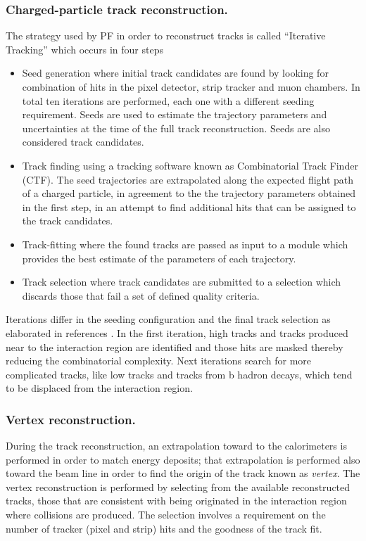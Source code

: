 \subsubsection*{Charged-particle track reconstruction.}

\noindent The strategy used by PF in order to reconstruct tracks is called ``Iterative Tracking'' which occurs in four steps

\begin{itemize}
\item Seed generation where initial track candidates are found by looking for combination of hits in the pixel detector, strip tracker and muon chambers. In total ten iterations are performed, each one with a different seeding requirement. Seeds are used to estimate the trajectory parameters and uncertainties at the time of the full track reconstruction. Seeds are also considered track candidates.    
\item Track finding using a tracking software known as Combinatorial Track Finder (CTF)\cite{ctf}. The seed trajectories are extrapolated along the expected flight path of a charged particle, in agreement to the the trajectory parameters obtained in the first step, in an attempt to find additional hits that can be assigned to the track candidates. 
\item Track-fitting where the found tracks are passed as input to a module which provides the best estimate of the parameters of each trajectory.
\item Track selection where track candidates are submitted to a selection which discards those that fail a set of defined quality criteria.
\end{itemize}

\noindent Iterations differ in the seeding configuration and the final track selection as elaborated in references \cite{particle_flow, particle_flow2}. In the first iteration, high \pt tracks and tracks produced near to the interaction region are identified and those hits are masked thereby reducing the combinatorial complexity. Next iterations search for more complicated tracks, like low \pt tracks and tracks from b hadron decays, which tend to be displaced from the interaction region.

\subsubsection*{Vertex reconstruction.}

\noindent During the track reconstruction, an extrapolation toward to the calorimeters is performed in order to match energy deposits; that extrapolation is performed also toward the beam line in order to find the origin of the track known as \textit{vertex}. The vertex reconstruction is performed by selecting from the available reconstructed tracks, those that are consistent with being originated in the interaction region where \pp collisions are produced. The selection involves a requirement on the number of tracker (pixel and strip) hits and the goodness of the track fit.\\

